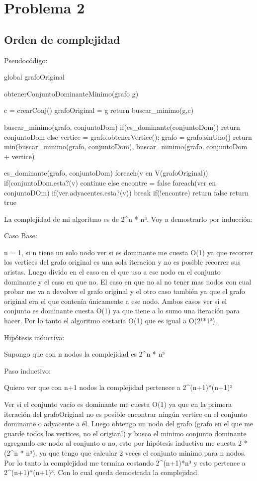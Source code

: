 \section{Problema 2}

\subsection{Orden de complejidad}

Pseudocódigo:

global grafoOriginal

obtenerConjuntoDominanteMinimo(grafo g){
c = crearConj()
grafoOriginal = g
return buscar_minimo(g,c)

}

buscar_minimo(grafo, conjuntoDom){
	if(es_dominante(conjuntoDom)){
		return conjuntoDom
	}else{
		vertice = grafo.obtenerVertice(); 
		grafo = grafo.sinUno()
		return min(buscar_minimo(grafo, conjuntoDom), buscar_minimo(grafo, conjuntoDom + vertice)
	}
}

es_dominante(grafo, conjuntoDom){
	foreach(v en V(grafoOriginal)){
		if(conjuntoDom.esta?(v){
			continue
		}else{
			encontre = false
			foreach(ver en conjuntoDOm){
				if(ver.adyacentes.esta?(v))
					break
			}
			if(!encontre)
				return false
		}
	}
	return true
}

La complejidad de mi algoritmo es de 2^n * n³. Voy a demostrarlo por inducción:

Caso Base:

n = 1, si n tiene un solo nodo ver si es dominante me cuesta O(1) ya que recorrer los vertices del grafo original es una sola iteracion y no es posible recorrer sus aristas. Luego divido en el caso en el que uso a ese nodo en el conjunto dominante y el caso en que no. El caso en que no al no tener mas nodos con cual probar me va a devolver el grafo original y el otro caso también ya que el grafo original era el que contenía únicamente a ese nodo. Ambos casos ver si el conjunto es dominante cuesta O(1) ya que tiene a lo sumo una iteración para hacer. Por lo tanto el algoritmo costaría O(1) que es igual a O(2¹*1³).

Hipótesis inductiva:

Supongo que con n nodos la complejidad es 2^n * n³

Paso inductivo:

Quiero ver que con n+1 nodos la complejidad pertenece a 2^(n+1)*(n+1)³

Ver si el conjunto vacío es dominante me cuesta O(1) ya que en la primera iteración del grafoOriginal no es posible encontrar ningún vertice en el conjunto dominante o adyacente a él. Luego obtengo un nodo del grafo (grafo en el que me guarde todos los vertices, no el origianl) y busco el minimo conjunto dominante agregando ese nodo al conjunto o no, esto por hipótesis inductiva me cuesta 2 * (2^n * n³), ya que tengo que calcular 2 veces el conjunto minimo para n nodos. Por lo tanto la complejidad me termina costando  2^(n+1)*n³ y esto pertence a 2^(n+1)*(n+1)³. Con lo cual queda demostrada la complejidad.

